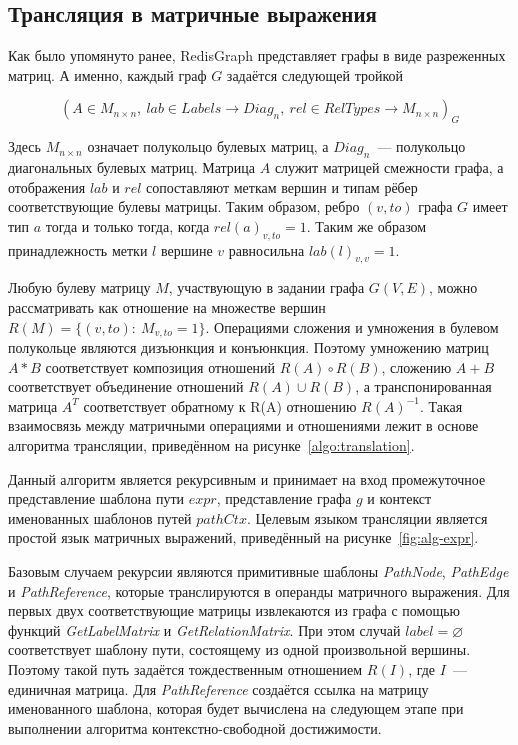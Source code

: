 \subsection{Трансляция в матричные выражения}
Как было упомянуто ранее, RedisGraph представляет графы в виде разреженных матриц. А именно, каждый граф $G$ задаётся следующей тройкой

\[
(A \in M_{n\times n},~lab \in Labels \rightarrow Diag_n,~rel \in RelTypes \rightarrow M_{n \times n})_G
\]

Здесь $M_{n \times n}$ означает полукольцо булевых матриц, а $Diag_n$~--- полукольцо диагональных булевых матриц. Матрица $A$ служит матрицей смежности графа, а отображения $lab$ и $rel$ сопоставляют меткам вершин и типам рёбер соответствующие булевы матрицы. Таким образом, ребро $(v, to)$ графа $G$ имеет тип $a$ тогда и только тогда, когда $rel(a)_{v,to} = 1$.  Таким же образом принадлежность метки $l$ вершине $v$ равносильна $lab(l)_{v,v}=1$.

Любую булеву матрицу $M$, участвующую в задании графа $G(V, E)$, можно рассматривать как отношение на множестве вершин $R(M) = \{(v, to):~M_{v,to}=1\}$. Операциями сложения и умножения в булевом полукольце являются дизъюнкция и конъюнкция. Поэтому умножению матриц $A*B$ соответствует композиция отношений $R(A) \circ R(B)$, сложению $A+B$ соответствует объединение отношений $R(A) \cup R(B)$, а транспонированная матрица $A^T$ соответствует обратному к R(A) отношению $R(A)^{-1}$. Такая взаимосвязь между матричными операциями и отношениями лежит в основе алгоритма трансляции, приведённом на рисунке~\ref{algo:translation}.

Данный алгоритм является рекурсивным и принимает на вход промежуточное представление шаблона пути $expr$, представление графа $g$ и контекст именованных шаблонов путей $pathCtx$. Целевым языком трансляции является простой язык матричных выражений, приведённый на рисунке~\ref{fig:alg-expr}.

Базовым случаем рекурсии являются примитивные шаблоны \textit{Path\-Node}, \textit{PathEdge} и \textit{PathReference}, которые транслируются в операнды матричного выражения. Для первых двух соответствующие матрицы извлекаются из графа с помощью функций \textit{GetLabel\-Matrix} и \textit{GetRelation\-Matrix}. При этом случай $label = \varnothing$ соответствует шаблону пути, состоящему из одной произвольной вершины. Поэтому такой путь задаётся тождественным отношением $R(I)$, где $I$~--- единичная матрица. Для \textit{Path\-Reference} создаётся ссылка на матрицу именованного шаблона, которая будет вычислена на следующем этапе при выполнении алгоритма контекстно-свободной достижимости.

